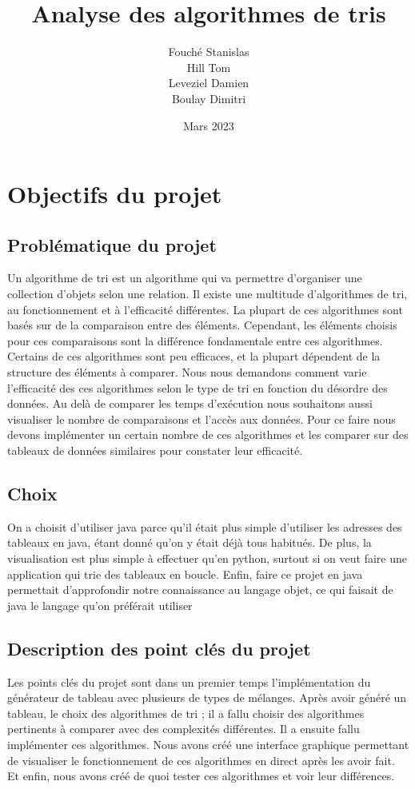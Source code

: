 \documentclass{article}
\title{Analyse des algorithmes de tris}
\author{Fouché Stanislas \\ Hill Tom \\ Leveziel Damien \\ Boulay Dimitri}
\date{Mars 2023}
\begin{document}
\maketitle
\newpage
\tableofcontents
\newpage
\section{Objectifs du projet}

\subsection{Problématique du projet}
Un algorithme de tri est un algorithme qui va permettre d'organiser une collection d'objets selon une relation. Il existe une multitude d'algorithmes de tri, au fonctionnement et à l'efficacité différentes. La plupart de ces algorithmes sont basés sur de la comparaison entre des éléments. Cependant, les éléments choisis pour ces comparaisons sont la différence fondamentale entre ces algorithmes. Certains de ces algorithmes sont peu efficaces, et la plupart dépendent de la structure des éléments à comparer. Nous nous demandons comment varie l'efficacité des ces algorithmes selon le type de tri en fonction du désordre des données. Au delà de comparer les temps d'exécution nous souhaitons aussi visualiser le nombre de comparaisons et l'accès aux données. Pour ce faire nous devons implémenter un certain nombre de ces algorithmes et les comparer sur des tableaux de données similaires pour constater leur efficacité. 

\subsection{Choix} %
On a choisit d'utiliser java parce qu'il était plus simple d'utiliser les adresses des tableaux en java, étant donné qu'on y était déjà tous habitués. De plus, la visualisation est plus simple à effectuer qu'en python, surtout si on veut faire une application qui trie des tableaux en boucle. Enfin, faire ce projet en java permettait d'approfondir notre connaissance au langage objet, ce qui faisait de java le langage qu'on préférait utiliser

\subsection{Description des point clés du projet}
Les points clés du projet sont dans un premier temps l'implémentation du générateur de tableau avec plusieurs de types de mélanges. Après avoir généré un tableau, le choix des algorithmes de tri ; il a fallu choisir des algorithmes pertinents à comparer avec des complexités différentes. Il a ensuite fallu implémenter ces algorithmes. Nous avons créé une interface graphique permettant de visualiser le fonctionnement de ces algorithmes en direct après les avoir fait. Et enfin, nous avons créé de quoi tester ces algorithmes et voir leur différences.
\end{document}

